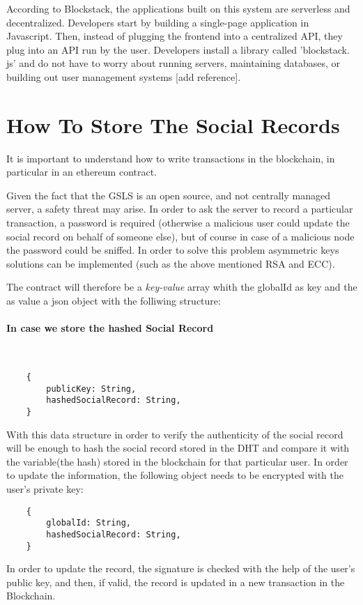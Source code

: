 According to Blockstack, the applications built on this system are serverless and decentralized. Developers start by building a single-page application in Javascript. Then, instead of plugging the frontend into a centralized API, they plug into an API run by the user. Developers install a library called ’blockstack. js’ and do not have to worry about running servers, maintaining databases, or building out user management systems [add reference].


\section{How To Store The Social Records}
It is important to understand how to write transactions in the blockchain, in particular in an ethereum contract.

Given the fact that the GSLS is an open source, and not centrally managed server, a safety threat may arise.
In order to ask the server to record a particular transaction, a password is required (otherwise a malicious user could update the social record on behalf of someone else), but of course in case of a malicious node the password could be sniffed.
In order to solve this problem asymmetric keys solutions can be implemented (such as the above mentioned RSA and ECC).


The contract will therefore be a \textit{key-value} array whith the globalId as key and the as value a json object with the folliwing structure:

\paragraph{In case we store the hashed Social Record}\
\begin{lstlisting}
	{
		publicKey: String,
		hashedSocialRecord: String,
	}
\end{lstlisting}

With this data structure in order to verify the authenticity of the social record will be enough to hash the social record stored in the DHT and compare it with the variable(the hash) stored in the blockchain for that particular user.
In order to update the information, the following object needs to be encrypted with the user’s private key:

\begin{lstlisting}
	{
		globalId: String,
		hashedSocialRecord: String,
	}
\end{lstlisting}

In order to update the record, the signature is checked with the help of the user’s public key, and then, if valid, the record is updated in a new transaction in the Blockchain.


